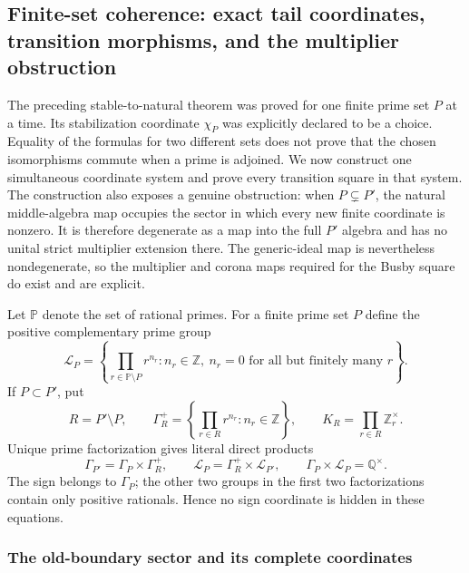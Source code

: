 \subsection{Finite-set coherence: exact tail coordinates, transition morphisms,
and the multiplier obstruction}
\label{subsec:finite-set-coherence}

The preceding stable-to-natural theorem was proved for one finite prime set
$P$ at a time.  Its stabilization coordinate $\chi_P$ was explicitly declared
to be a choice.  Equality of the formulas for two different sets does not
prove that the chosen isomorphisms commute when a prime is adjoined.  We now
construct one simultaneous coordinate system and prove every transition
square in that system.  The construction also exposes a genuine obstruction:
when $P\subsetneq P'$, the natural middle-algebra map occupies the sector in
which every new finite coordinate is nonzero.  It is therefore degenerate as
a map into the full $P'$ algebra and has no unital strict multiplier extension
there.  The generic-ideal map is nevertheless nondegenerate, so the multiplier
and corona maps required for the Busby square do exist and are explicit.

Let $\mathbb P$ denote the set of rational primes.  For a finite prime set
$P$ define the positive complementary prime group
\begin{equation}
 \mathcal L_P=
 \left\{\prod_{r\in\mathbb P\setminus P}r^{n_r}:
 n_r\in\mathbb Z,\ n_r=0\text{ for all but finitely many }r\right\}.
 \label{eq:coherence-complementary-prime-group}
\end{equation}
If $P\subset P'$, put
\begin{equation}
 R=P'\setminus P,\qquad
 \Gamma_R^+=\left\{\prod_{r\in R}r^{n_r}:n_r\in\mathbb Z\right\},
 \qquad K_R=\prod_{r\in R}\mathbb Z_r^\times.
 \label{eq:coherence-new-prime-data}
\end{equation}
Unique prime factorization gives literal direct products
\begin{equation}
 \Gamma_{P'}=\Gamma_P\times\Gamma_R^+,
 \qquad
 \mathcal L_P=\Gamma_R^+\times\mathcal L_{P'},
 \qquad
 \Gamma_P\times\mathcal L_P=\mathbb Q^\times.
 \label{eq:coherence-group-factorizations}
\end{equation}
The sign belongs to $\Gamma_P$; the other two groups in the first two
factorizations contain only positive rationals.  Hence no sign coordinate is
hidden in these equations.

\subsubsection{The old-boundary sector and its complete coordinates}

